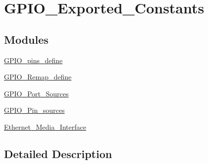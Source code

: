 \hypertarget{group___g_p_i_o___exported___constants}{}\section{G\+P\+I\+O\+\_\+\+Exported\+\_\+\+Constants}
\label{group___g_p_i_o___exported___constants}
\subsection*{Modules}
\begin{DoxyCompactItemize}
\item 
\hyperlink{group___g_p_i_o__pins__define}{G\+P\+I\+O\+\_\+pins\+\_\+define}
\item 
\hyperlink{group___g_p_i_o___remap__define}{G\+P\+I\+O\+\_\+\+Remap\+\_\+define}
\item 
\hyperlink{group___g_p_i_o___port___sources}{G\+P\+I\+O\+\_\+\+Port\+\_\+\+Sources}
\item 
\hyperlink{group___g_p_i_o___pin__sources}{G\+P\+I\+O\+\_\+\+Pin\+\_\+sources}
\item 
\hyperlink{group___ethernet___media___interface}{Ethernet\+\_\+\+Media\+\_\+\+Interface}
\end{DoxyCompactItemize}


\subsection{Detailed Description}
